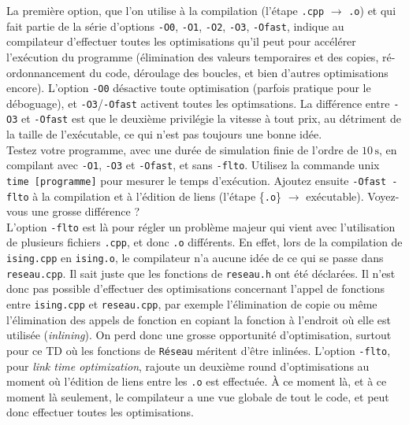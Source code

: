 \documentclass{book}
\newcommand{\inline}[1]{\texttt{#1}}
\begin{document}
La première option, que l'on utilise à la compilation (l'étape \texttt{.cpp} $\to$ \texttt{.o}) et qui fait partie de la série d'options \inline{-O0}, \inline{-O1}, \inline{-O2}, \inline{-O3}, \inline{-Ofast}, indique au compilateur d'effectuer toutes les optimisations qu'il peut pour accélérer l'exécution du programme (élimination des valeurs temporaires et des copies, ré-ordonnancement du code, déroulage des boucles, et bien d'autres optimisations encore). L'option \inline{-O0} désactive toute optimisation (parfois pratique pour le déboguage), et \inline{-O3}/\inline{-Ofast} activent toutes les optimsations. La différence entre \inline{-O3} et \inline{-Ofast} est que le deuxième privilégie la vitesse à tout prix, au détriment de la taille de l'exécutable, ce qui n'est pas toujours une bonne idée.\\

Testez votre programme, avec une durée de simulation finie de l'ordre de $10\,\mathrm{s}$, en compilant avec \inline{-O1}, \inline{-O3} et \inline{-Ofast}, et sans \inline{-flto}. Utilisez la commande unix \texttt{time [programme]} pour mesurer le temps d'exécution. Ajoutez ensuite \inline{-Ofast -flto} à la compilation et à l'édition de liens (l'étape \{\texttt{.o}\} $\to$ exécutable). Voyez-vous une grosse différence ?\\

L'option \inline{-flto} est là pour régler un problème majeur qui vient avec l'utilisation de plusieurs fichiers \texttt{.cpp}, et donc \texttt{.o} différents. En effet, lors de la compilation de \texttt{ising.cpp} en \texttt{ising.o}, le compilateur n'a aucune idée de ce qui se passe dans \texttt{reseau.cpp}. Il sait juste que les fonctions de \texttt{reseau.h} ont été déclarées. Il n'est donc pas possible d'effectuer des optimisations concernant l'appel de fonctions entre \texttt{ising.cpp} et \texttt{reseau.cpp}, par exemple l'élimination de copie ou même l'élimination des appels de fonction en copiant la fonction à l'endroit où elle est utilisée (\emph{inlining}). On perd donc une grosse opportunité d'optimisation, surtout pour ce TD où les fonctions de \inline{Réseau} méritent d'être inlinées. L'option \inline{-flto}, pour \emph{link time optimization}, rajoute un deuxième round d'optimisations au moment où l'édition de liens entre les \texttt{.o} est effectuée. À ce moment là, et à ce moment là seulement, le compilateur a une vue globale de tout le code, et peut donc effectuer toutes les optimisations.\\
\end{document}
